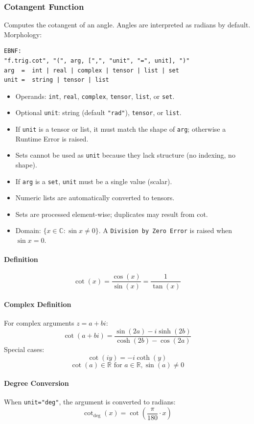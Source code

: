 \subsubsection{Cotangent Function}
Computes the cotangent of an angle. Angles are interpreted as radians by default.\\
Morphology:
\begin{verbatim}
EBNF:
"f.trig.cot", "(", arg, [",", "unit", "=", unit], ")"
arg  =  int | real | complex | tensor | list | set
unit =  string | tensor | list
\end{verbatim}
\begin{itemize}
\item Operands: \texttt{int}, \texttt{real}, \texttt{complex}, \texttt{tensor}, \texttt{list}, or \texttt{set}.
\item Optional \texttt{unit}: string (default \texttt{"rad"}), \texttt{tensor}, or \texttt{list}.
\item If \texttt{unit} is a tensor or list, it must match the shape of \texttt{arg}; otherwise a Runtime Error is raised.
\item Sets cannot be used as \texttt{unit} because they lack structure (no indexing, no shape).
\item If \texttt{arg} is a \texttt{set}, \texttt{unit} must be a single value (scalar).
\item Numeric lists are automatically converted to tensors.
\item Sets are processed element-wise; duplicates may result from cot.
\item Domain: $\{x \in \mathbb{C} : \sin x \neq 0\}$. A \texttt{Division by Zero Error} is raised when $\sin x = 0$.
\end{itemize}

\paragraph{Definition}
\[
\cot(x) = \frac{\cos(x)}{\sin(x)} = \frac{1}{\tan(x)}
\]

\paragraph{Complex Definition}
For complex arguments $z = a + bi$:
\[
\cot(a + bi) = \frac{\sin(2a) - i\sinh(2b)}{\cosh(2b) - \cos(2a)}
\]
Special cases:
\[
\cot(iy) = -i\coth(y)
\]
\[
\cot(a) \in \mathbb{R} \text{ for } a \in \mathbb{R}, \sin(a) \neq 0
\]

\paragraph{Degree Conversion}
When \texttt{unit="deg"}, the argument is converted to radians:
\[
\cot_{\text{deg}}(x) = \cot\left(\frac{\pi}{180} \cdot x\right)
\]

